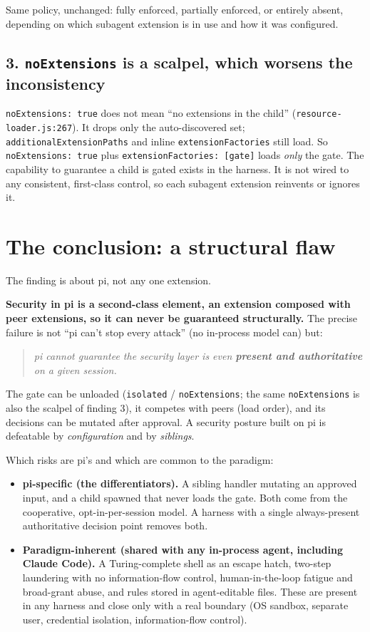 \documentclass[11pt]{article}
\newcommand{\code}[1]{\texttt{#1}}
\newenvironment{pullquote}
  {\begin{quote}\itshape}
  {\end{quote}}
\begin{document}
Same policy, unchanged: fully enforced, partially enforced, or entirely absent,
depending on which subagent extension is in use and how it was configured.

\subsection*{3. \code{noExtensions} is a scalpel, which worsens the inconsistency}

\code{noExtensions: true} does not mean ``no extensions in the child''
(\code{resource-loader.js:267}). It drops only the auto-discovered set;
\code{additionalExtensionPaths} and inline \code{extensionFactories} still load.
So \code{noExtensions: true} plus \code{extensionFactories: [gate]} loads
\emph{only} the gate. The capability to guarantee a child is gated exists in the
harness. It is not wired to any consistent, first-class control, so each subagent
extension reinvents or ignores it.

\section*{The conclusion: a structural flaw}

The finding is about pi, not any one extension.

\textbf{Security in pi is a second-class element, an extension composed with peer
extensions, so it can never be guaranteed structurally.} The precise failure is
not ``pi can't stop every attack'' (no in-process model can) but:

\begin{pullquote}
pi cannot guarantee the security layer is even \textbf{present and authoritative}
on a given session.
\end{pullquote}

The gate can be unloaded (\code{isolated} / \code{noExtensions}; the same
\code{noExtensions} is also the scalpel of finding 3), it competes with peers
(load order), and its decisions can be mutated after approval. A security posture
built on pi is defeatable by \emph{configuration} and by \emph{siblings}.

Which risks are pi's and which are common to the paradigm:

\begin{itemize}
  \item \textbf{pi-specific (the differentiators).} A sibling handler mutating an
    approved input, and a child spawned that never loads the gate. Both come from
    the cooperative, opt-in-per-session model. A harness with a single
    always-present authoritative decision point removes both.
  \item \textbf{Paradigm-inherent (shared with any in-process agent, including
    Claude Code).} A Turing-complete shell as an escape hatch, two-step laundering
    with no information-flow control, human-in-the-loop fatigue and broad-grant
    abuse, and rules stored in agent-editable files. These are present in any
    harness and close only with a real boundary (OS sandbox, separate user,
    credential isolation, information-flow control).
\end{itemize}
\end{document}
